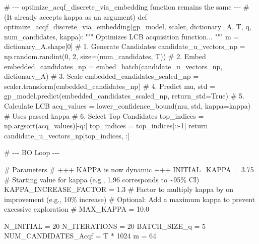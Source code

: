 \documentclass[
  letterpaper,
  DIV=11,
  numbers=noendperiod]{scrartcl}
\newenvironment{Shaded}{\begin{snugshade}}{\end{snugshade}}
\newcommand{\CommentTok}[1]{\textcolor[rgb]{0.37,0.37,0.37}{#1}}
\newcommand{\ControlFlowTok}[1]{\textcolor[rgb]{0.00,0.23,0.31}{#1}}
\newcommand{\DecValTok}[1]{\textcolor[rgb]{0.68,0.00,0.00}{#1}}
\newcommand{\FloatTok}[1]{\textcolor[rgb]{0.68,0.00,0.00}{#1}}
\newcommand{\KeywordTok}[1]{\textcolor[rgb]{0.00,0.23,0.31}{#1}}
\newcommand{\NormalTok}[1]{\textcolor[rgb]{0.00,0.23,0.31}{#1}}
\newcommand{\OperatorTok}[1]{\textcolor[rgb]{0.37,0.37,0.37}{#1}}
\newcommand{\VariableTok}[1]{\textcolor[rgb]{0.07,0.07,0.07}{#1}}
\begin{document}
\begin{Shaded}
\begin{Highlighting}[]
\CommentTok{\# {-}{-}{-} optimize\_acqf\_discrete\_via\_embedding function remains the same {-}{-}{-}}
\CommentTok{\# (It already accepts kappa as an argument)}
\KeywordTok{def}\NormalTok{ optimize\_acqf\_discrete\_via\_embedding(gp\_model, scaler, dictionary\_A, T, q, num\_candidates, kappa):}
    \CommentTok{""" Optimizes LCB acquisition function... """}
\NormalTok{    m }\OperatorTok{=}\NormalTok{ dictionary\_A.shape[}\DecValTok{0}\NormalTok{]}
    \CommentTok{\# 1. Generate Candidates}
\NormalTok{    candidate\_u\_vectors\_np }\OperatorTok{=}\NormalTok{ np.random.randint(}\DecValTok{0}\NormalTok{, }\DecValTok{2}\NormalTok{, size}\OperatorTok{=}\NormalTok{(num\_candidates, T))}
    \CommentTok{\# 2. Embed}
\NormalTok{    embedded\_candidates\_np }\OperatorTok{=}\NormalTok{ embed\_batch(candidate\_u\_vectors\_np, dictionary\_A)}
    \CommentTok{\# 3. Scale}
\NormalTok{    embedded\_candidates\_scaled\_np }\OperatorTok{=}\NormalTok{ scaler.transform(embedded\_candidates\_np)}
    \CommentTok{\# 4. Predict}
\NormalTok{    mu, std }\OperatorTok{=}\NormalTok{ gp\_model.predict(embedded\_candidates\_scaled\_np, return\_std}\OperatorTok{=}\VariableTok{True}\NormalTok{)}
    \CommentTok{\# 5. Calculate LCB}
\NormalTok{    acq\_values }\OperatorTok{=}\NormalTok{ lower\_confidence\_bound(mu, std, kappa}\OperatorTok{=}\NormalTok{kappa) }\CommentTok{\# Uses passed kappa}
    \CommentTok{\# 6. Select Top Candidates}
\NormalTok{    top\_indices }\OperatorTok{=}\NormalTok{ np.argsort(acq\_values)[}\OperatorTok{{-}}\NormalTok{q:]}
\NormalTok{    top\_indices }\OperatorTok{=}\NormalTok{ top\_indices[::}\OperatorTok{{-}}\DecValTok{1}\NormalTok{]}
    \ControlFlowTok{return}\NormalTok{ candidate\_u\_vectors\_np[top\_indices, :]}


\CommentTok{\# {-}{-}{-} BO Loop {-}{-}{-}}

\CommentTok{\# Parameters}
\CommentTok{\# +++ KAPPA is now dynamic +++}
\NormalTok{INITIAL\_KAPPA }\OperatorTok{=} \FloatTok{3.75} \CommentTok{\# Starting value for kappa (e.g., 1.96 corresponds to \textasciitilde{}95\% CI)}
\NormalTok{KAPPA\_INCREASE\_FACTOR }\OperatorTok{=} \FloatTok{1.3} \CommentTok{\# Factor to multiply kappa by on improvement (e.g., 10\% increase)}
\CommentTok{\# Optional: Add a maximum kappa to prevent excessive exploration}
\CommentTok{\# MAX\_KAPPA = 10.0}

\NormalTok{N\_INITIAL }\OperatorTok{=} \DecValTok{20}
\NormalTok{N\_ITERATIONS }\OperatorTok{=} \DecValTok{20}
\NormalTok{BATCH\_SIZE\_q }\OperatorTok{=} \DecValTok{5}
\NormalTok{NUM\_CANDIDATES\_Acqf }\OperatorTok{=}\NormalTok{ T }\OperatorTok{*} \DecValTok{1024}
\NormalTok{m }\OperatorTok{=} \DecValTok{64}


\end{Highlighting}
\end{Shaded}
\end{document}
